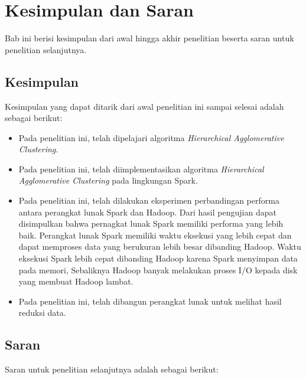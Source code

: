 \chapter{Kesimpulan dan Saran}

Bab ini berisi kesimpulan dari awal hingga akhir penelitian beserta saran untuk penelitian selanjutnya.

\section{Kesimpulan}

Kesimpulan yang dapat ditarik dari awal penelitian ini sampai selesai adalah sebagai berikut:

\begin{itemize}

\item Pada penelitian ini, telah dipelajari algoritma  {\it Hierarchical Agglomerative Clustering}.

\item Pada penelitian ini, telah diimplementasikan algoritma {\it Hierarchical Agglomerative Clustering} pada lingkungan Spark.

\item Pada penelitian ini, telah dilakukan eksperimen perbandingan performa antara perangkat lunak Spark dan Hadoop. Dari hasil pengujian dapat disimpulkan bahwa pernagkat lunak Spark memiliki performa yang lebih baik. Perangkat lunak Spark memiliki waktu eksekusi yang lebih cepat dan dapat memproses data yang berukuran lebih besar dibanding Hadoop. Waktu eksekusi Spark lebih cepat dibanding Hadoop karena Spark menyimpan data pada memori, Sebaliknya Hadoop banyak melakukan proses I/O kepada disk yang membuat Hadoop lambat.

\item Pada penelitian ini, telah dibangun perangkat lunak untuk melihat hasil reduksi data.

\end{itemize}

\section{Saran}

Saran untuk penelitian selanjutnya adalah sebagai berikut:

